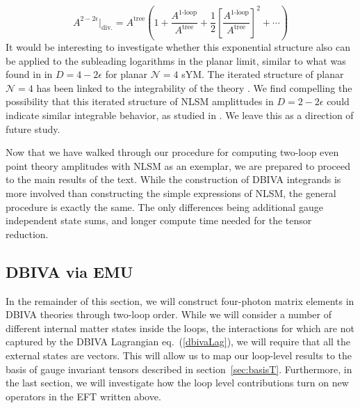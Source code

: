 \documentclass[11pt,letter]{article}
\def\sect#1{section~\ref{#1}}
\def\eqn#1{eq.~(\ref{#1})}
\begin{document}
\begin{equation}\label{eq:expNLSM}
A^{2-2\epsilon}\bigg|_{\text{div.}} = A^{\text{tree}}\left( 1 + \frac{A^{\text{1-loop}}}{ A^{\text{tree}}} + \frac{1}{2}\left[\frac{A^{\text{1-loop}}}{ A^{\text{tree}}} \right]^2 + \cdots \right)
\end{equation}
It would be interesting to investigate whether this exponential structure also can be applied to the subleading logarithms in the planar limit, similar to what was found in \cite{Anastasiou:2003kj,Bern:2005iz} in $D=4-2\epsilon$ for planar $\mathcal{N}=4$ sYM. The iterated structure of planar $\mathcal{N}=4$ has been linked to the integrability of the theory \cite{Sterman:2002qn,Minahan:2002ve,Bena:2003wd,Beisert:2003jj,Beisert:2003jb,Beisert:2003yb,Dolan:2003uh,Arutyunov:2003rg,Ryzhov:2004nz,Frolov:2005iq}. We find compelling the possibility that this iterated structure of NLSM amplittudes in $D=2-2\epsilon$ could indicate similar integrable behavior, as studied in \cite{Shankar:1977cm,Zamolodchikov:1977nu,Zamolodchikov:1978xm, Komatsu:2019hgc}. We leave this as a direction of future study. 

Now that we have walked through our procedure for computing two-loop even point theory amplitudes with NLSM as an exemplar, we are prepared to proceed to the main results of the text. While the construction of DBIVA integrands is more involved than constructing the simple expressions of NLSM, the general procedure is exactly the same. The only differences being additional gauge independent state sums, and longer compute time needed for the tensor reduction. 


\subsection{DBIVA via EMU}\label{sec:DBIU}
In the remainder of this section, we will construct four-photon matrix elements in DBIVA theories through two-loop order. 
While we will consider a number of different internal matter states inside the loops, the interactions for which are not captured by the DBIVA Lagrangian \eqn{dbivaLag}, we will require that all the external states are vectors. This will allow us to map our loop-level results to the basis of gauge invariant tensors described in \sect{sec:basisT}. Furthermore, in the last section, we will investigate how the loop level contributions turn on new operators in the EFT written above. 
 
\end{document}
